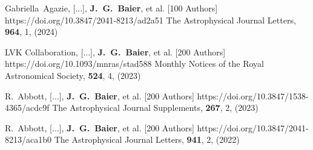          {Gabriella~{Agazie}, [...], \textbf{J.~G.~{Baier}}, et al. [100 Authors]}
         {https://doi.org/10.3847/2041-8213/ad2a51}
         {{The Astrophysical Journal Letters}, \textbf{964}, 1, (2024)}

         {{LVK Collaboration}, [...], \textbf{J.~G.~{Baier}}, et al. [200 Authors]}
         {https://doi.org/10.1093/mnras/stad588}
         {{Monthly Notices of the Royal Astronomical Society}, \textbf{524}, 4, (2023)}

         {R.~{Abbott}, [...], \textbf{J.~G.~{Baier}}, et al. [200 Authors]}
         {https://doi.org/10.3847/1538-4365/acdc9f}
         {{The Astrophysical Journal Supplements}, \textbf{267}, 2, (2023)}

         {R.~{Abbott}, [...], \textbf{J.~G.~{Baier}}, et al. [200 Authors]}
         {https://doi.org/10.3847/2041-8213/aca1b0}
         {{The Astrophysical Journal Letters}, \textbf{941}, 2, (2022)}

